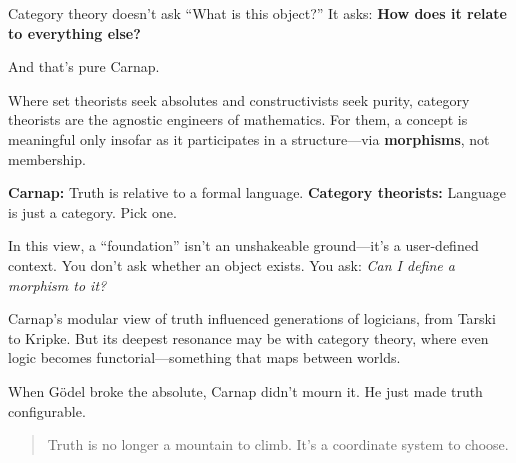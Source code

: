\begin{tcolorbox}[colback=gray!5!white, colframe=black, title=\textbf{Sidebar: Category Theory as Carnap’s Heir}, fonttitle=\bfseries, arc=1.5mm, boxrule=0.4pt]

Category theory doesn’t ask “What is this object?”  
It asks: \textbf{How does it relate to everything else?}

And that’s pure Carnap.

Where set theorists seek absolutes and constructivists seek purity, category theorists are the agnostic engineers of mathematics. For them, a concept is meaningful only insofar as it participates in a structure—via \textbf{morphisms}, not membership.

\medskip

\textbf{Carnap:} Truth is relative to a formal language.  
\textbf{Category theorists:} Language is just a category. Pick one.

\medskip

In this view, a “foundation” isn’t an unshakeable ground—it’s a user-defined context. You don’t ask whether an object exists. You ask: \textit{Can I define a morphism to it?}

\end{tcolorbox}

\vspace{1em}

Carnap’s modular view of truth influenced generations of logicians, from Tarski to Kripke. But its deepest resonance may be with category theory, where even logic becomes functorial—something that maps between worlds.

When Gödel broke the absolute, Carnap didn’t mourn it.  
He just made truth configurable.

\begin{quote}
Truth is no longer a mountain to climb. It’s a coordinate system to choose.
\end{quote}



